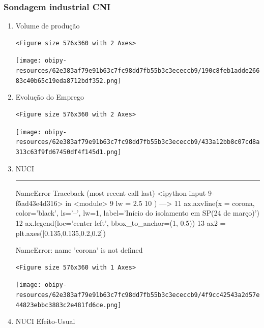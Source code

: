 \documentclass[11pt]{article}
\begin{document}
\subsubsection{Sondagem industrial CNI}
\label{sec:org8386586}


\begin{enumerate}
\item Volume de produção
\label{sec:org5ef87af}

\begin{verbatim}
<Figure size 576x360 with 2 Axes>
\end{verbatim}


\begin{center}
\texttt{[image: obipy-resources/62e383af79e91b63c7fc98dd7fb55b3c3ececcb9/190c8feb1adde26683c40b65c19eda8712bdf352.png]}
\end{center}

\item Evolução do Emprego
\label{sec:orgaa3b896}

\begin{verbatim}
<Figure size 576x360 with 2 Axes>
\end{verbatim}


\begin{center}
\texttt{[image: obipy-resources/62e383af79e91b63c7fc98dd7fb55b3c3ececcb9/433a12bb8c07cd8a313c63f9fd67450df4f145d1.png]}
\end{center}


\item NUCI
\label{sec:org2c65816}

\noindent\rule{\textwidth}{0.5pt}
NameError                                 Traceback (most recent call last)
<ipython-input-9-f5ad43e4d316> in <module>
      9     lw = 2.5
     10 )
---> 11 ax.axvline(x = corona, color='black', ls='--', lw=1, label='Início do isolamento em SP\n(24 de março)')
     12 ax.legend(loc='center left', bbox\_to\_anchor=(1, 0.5))
     13 ax2 = plt.axes([0.135,0.135,0.2,0.2])

NameError: name 'corona' is not defined

\begin{verbatim}
<Figure size 576x360 with 1 Axes>
\end{verbatim}


\begin{center}
\texttt{[image: obipy-resources/62e383af79e91b63c7fc98dd7fb55b3c3ececcb9/4f9cc42543a2d57e44823ebbc3883c2e481fd6ce.png]}
\end{center}

\item NUCI Efeito-Usual
\label{sec:org9c836b0}


\end{enumerate}
\end{document}
